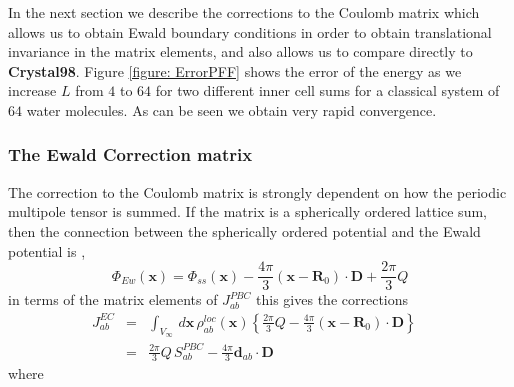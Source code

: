 \commentoutA{\documentclass[prb,aps,twocolumn,showpacs,twocolumngrid,superbib]{revtex4}}
\begin{document}
In the next section we describe the corrections to the Coulomb matrix
which allows us to obtain Ewald boundary conditions in order to obtain
translational invariance in the matrix elements, and also allows us
to compare directly to \textbf{Crystal98}. Figure \ref{figure: ErrorPFF}
shows the error of the energy as we increase \( L \) from \( 4 \)
to \( 64 \) for two different inner cell sums for a classical system
of \( 64 \) water molecules. As can be seen we obtain very rapid
convergence.


\subsubsection{The Ewald Correction matrix}

The correction to the Coulomb matrix is strongly dependent on how
the periodic multipole tensor is summed. If the matrix is a spherically
ordered lattice sum, then the connection between the spherically ordered
potential and the Ewald potential is \cite{Redlack72}, \begin{equation}
\label{EW_pot}
\Phi _{Ew}\left( \mathbf{x}\right) =\Phi _{ss}\left( \mathbf{x}\right) -\frac{4\pi }{3}{\left( \mathbf{x}-\mathbf{R}_{0}\right) \cdot \mathbf{D}}+\frac{2\pi }{3}Q
\end{equation}
in terms of the matrix elements of \( J_{ab}^{PBC} \) this gives
the corrections\begin{eqnarray}
J_{ab}^{EC} & = & \int _{V_{\infty }}\, d{\mathbf{x}}\, \rho ^{loc}_{ab}\left( {\mathbf{x}}\right) \left\{ \frac{2\pi }{3}Q-\frac{4\pi }{3}\left( \mathbf{x}-\mathbf{R}_{0}\right) \cdot \mathbf{D}\right\} \begin{array}{c}
\\

\end{array}\label{Jab_ec} \\
 & = & \frac{2\pi }{3}Q\, S_{ab}^{PBC}-\frac{4\pi }{3}\mathbf{d}_{ab}\cdot \mathbf{D}\label{Jab_ec_2} 
\end{eqnarray}
where
\end{document}
